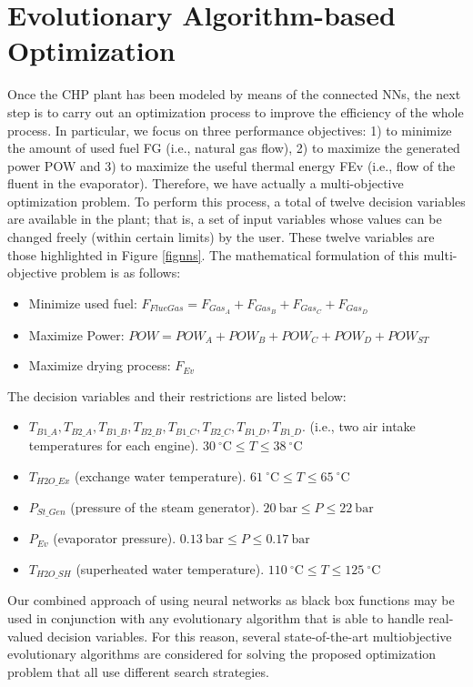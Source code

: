 \section{Evolutionary Algorithm-based Optimization}
\label{sec:optimization}
Once the CHP plant has been modeled by means of the connected NNs, the next step is to  carry out an optimization process to improve the efficiency of the whole process. In particular, we focus on three performance objectives: 1) to minimize the amount of used fuel FG (i.e., natural gas flow), 2) to maximize the generated power POW and 3) to maximize the useful thermal energy FEv (i.e., flow of the fluent in the evaporator). Therefore, we have actually a multi-objective optimization problem. To perform this process, a total of twelve decision variables  are available in the plant; that is, a set of input variables whose values can be changed freely (within certain limits) by the user. These twelve variables are those highlighted in  Figure  \ref{fignns}. The mathematical formulation of this multi-objective problem is as follows:
%
\begin{itemize}[-]
	\item Minimize used fuel:		$F_{FlueGas} = F_{Gas_A} + F_{Gas_B} + F_{Gas_C} + F_{Gas_D}$
	\item Maximize Power:		$POW = POW_A + POW_B + POW_C + POW_D + POW_{ST}$
	\item Maximize drying process: 	$F_{Ev}$
\end{itemize}
%
The decision variables and their restrictions are listed below:
%
\begin{itemize}[-]
	\item $T_{B1\_A}, T_{B2\_A}, T_{B1\_B}, T_{B2\_B}, T_{B1\_C}, T_{B2\_C}, T_{B1\_D}, T_{B1\_D}$. (i.e., two air intake temperatures for each engine). $30~^{\circ}\textrm{C} \leq T  \leq  38~^{\circ}\textrm{C}$
	\item $T_{H2O\_Ex}$ (exchange water temperature). $61~^{\circ}\textrm{C}  \leq T  \leq  65~^{\circ}\textrm{C}$
	\item $P_{St\_Gen}$ (pressure of the steam generator). $20~\textrm{bar}  \leq  P  \leq  22~\textrm{bar}$
	\item $P_{Ev}$ (evaporator pressure). $0.13~\textrm{bar}  \leq  P  \leq  0.17~\textrm{bar}$
	\item $T_{H2O\_SH}$ (superheated water temperature). $110~^{\circ}\textrm{C}  \leq  T  \leq  125~^{\circ}\textrm{C}$
\end{itemize}

Our combined approach of using neural networks as black box functions may be used in conjunction with any evolutionary algorithm that is able to handle real-valued decision variables. For this reason, several state-of-the-art multiobjective evolutionary algorithms are considered for solving the proposed optimization problem that all use different search strategies.

